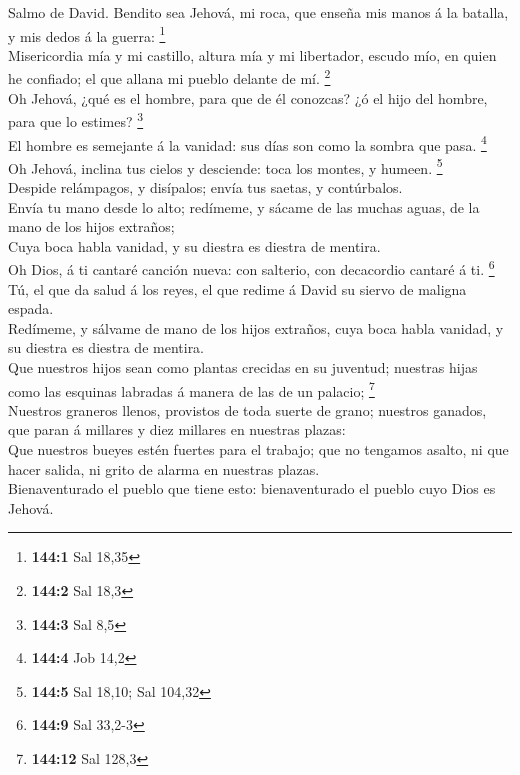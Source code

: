  Salmo de David. Bendito sea Jehová, mi roca, que enseña
mis manos á la batalla, y mis dedos á la guerra: \footnote{\textbf{144:1}
  Sal 18,35}\\
 Misericordia mía y mi castillo, altura mía y mi
libertador, escudo mío, en quien he confiado; el que allana mi pueblo
delante de mí. \footnote{\textbf{144:2} Sal 18,3}\\
 Oh Jehová, ¿qué es el hombre, para que de él conozcas? ¿ó
el hijo del hombre, para que lo estimes? \footnote{\textbf{144:3} Sal
  8,5}\\
 El hombre es semejante á la vanidad: sus días son como la
sombra que pasa. \footnote{\textbf{144:4} Job 14,2}\\
 Oh Jehová, inclina tus cielos y desciende: toca los
montes, y humeen. \footnote{\textbf{144:5} Sal 18,10; Sal 104,32}\\
 Despide relámpagos, y disípalos; envía tus saetas, y
contúrbalos.\\
 Envía tu mano desde lo alto; redímeme, y sácame de las
muchas aguas, de la mano de los hijos extraños;\\
 Cuya boca habla vanidad, y su diestra es diestra de
mentira.\\
 Oh Dios, á ti cantaré canción nueva: con salterio, con
decacordio cantaré á ti. \footnote{\textbf{144:9} Sal 33,2-3}\\
 Tú, el que da salud á los reyes, el que redime á David
su siervo de maligna espada.\\
 Redímeme, y sálvame de mano de los hijos extraños, cuya
boca habla vanidad, y su diestra es diestra de mentira.\\
 Que nuestros hijos sean como plantas crecidas en su
juventud; nuestras hijas como las esquinas labradas á manera de las de
un palacio; \footnote{\textbf{144:12} Sal 128,3}\\
 Nuestros graneros llenos, provistos de toda suerte de
grano; nuestros ganados, que paran á millares y diez millares en
nuestras plazas:\\
 Que nuestros bueyes estén fuertes para el trabajo; que
no tengamos asalto, ni que hacer salida, ni grito de alarma en nuestras
plazas.\\
 Bienaventurado el pueblo que tiene esto: bienaventurado
el pueblo cuyo Dios es Jehová.

